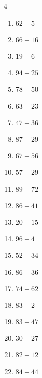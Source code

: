 \begin{multicols}{4}
\begin{enumerate}
  \item $62-5$
        \phantom{$=57$}

  \item $66-16$
        \phantom{$=50$}

  \item $19-6$
        \phantom{$=13$}

  \item $94-25$
        \phantom{$=69$}

  \item $78-50$
        \phantom{$=28$}

  \item $63-23$
        \phantom{$=40$}

  \item $47-36$
        \phantom{$=11$}

  \item $87-29$
        \phantom{$=58$}

  \item $67-56$
        \phantom{$=11$}

  \item $57-29$
        \phantom{$=28$}

  \item $89-72$
        \phantom{$=17$}

  \item $86-41$
        \phantom{$=45$}

  \item $20-15$
        \phantom{$=5$}

  \item $96-4$
        \phantom{$=92$}

  \item $52-34$
        \phantom{$=18$}

  \item $86-36$
        \phantom{$=50$}

  \item $74-62$
        \phantom{$=12$}

  \item $83-2$
        \phantom{$=81$}

  \item $83-47$
        \phantom{$=36$}

  \item $30-27$
        \phantom{$=3$}

  \item $82-12$
        \phantom{$=70$}

  \item $84-44$
        \phantom{$=40$}


\end{enumerate}
\end{multicols}
